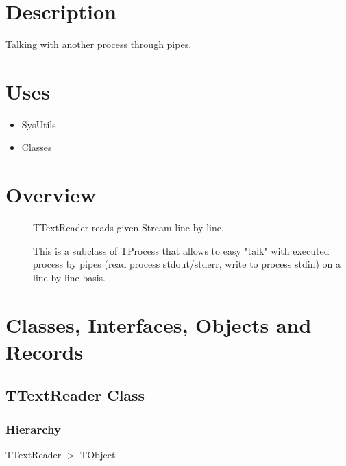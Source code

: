 \documentclass{report}
\newif\ifpdf
\begin{document}
\section{Description}
Talking with another process through pipes.\hfill\vspace*{1ex}

  
\section{Uses}
\begin{itemize}
\item \begin{ttfamily}SysUtils\end{ttfamily}\item \begin{ttfamily}Classes\end{ttfamily}\end{itemize}
\section{Overview}
\begin{description}
\item[\texttt{\begin{ttfamily}TTextReader\end{ttfamily} Class}]TTextReader reads given Stream line by line.
\item[\texttt{\begin{ttfamily}TProcessLineTalk\end{ttfamily} Class}]This is a subclass of TProcess that allows to easy "talk" with executed process by pipes (read process stdout/stderr, write to process stdin) on a line{-}by{-}line basis.
\end{description}
\section{Classes, Interfaces, Objects and Records}
\ifpdf
\subsection*{\large{\textbf{TTextReader Class}}\normalsize\hspace{1ex}\hrulefill}
\else
\subsection*{TTextReader Class}
\fi
\label{PasDoc_ProcessLineTalk.TTextReader}
\subsubsection*{\large{\textbf{Hierarchy}}\normalsize\hspace{1ex}\hfill}
TTextReader {$>$} TObject
\end{document}

